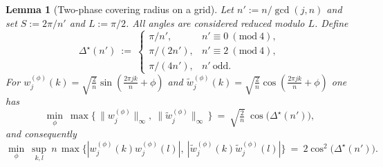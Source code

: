 \documentclass[12pt,fleqn]{amsart}
\newtheorem{lem}[thm]{Lemma}
\theoremstyle{remark}
\newcommand{\1}{\mathbf{1}}
\begin{document}
\begin{lem}[Two-phase covering radius on a grid]\label{lem:twophase}
Let $n':=n/\gcd(j,n)$ and set $S:=2\pi/n'$ and $L:=\pi/2$. All angles are considered reduced modulo $L$. Define
\[
\Delta^\star(n')\ :=\
\begin{cases}
\pi/n',     & n'\equiv 0\ (\mathrm{mod}\ 4),\\[1mm]
\pi/(2n'),  & n'\equiv 2\ (\mathrm{mod}\ 4),\\[1mm]
\pi/(4n'),  & n'\ \mathrm{odd}.
\end{cases}
\]
For $w^{(\phi)}_j(k)=\sqrt{\tfrac{2}{n}}\sin(\tfrac{2\pi jk}{n}+\phi)$ and
$\tilde w^{(\phi)}_j(k)=\sqrt{\tfrac{2}{n}}\cos(\tfrac{2\pi jk}{n}+\phi)$ one has
\[
\min_{\phi}\ \max\!\Big\{\,\|w^{(\phi)}_j\|_\infty,\ \|\tilde w^{(\phi)}_j\|_\infty\,\Big\}
\ =\ \sqrt{\tfrac2n}\ \cos\big(\Delta^\star(n')\big),
\]
and consequently
\[
\min_{\phi}\ \sup_{k,l}\ n\,\max\{|w^{(\phi)}_j(k)w^{(\phi)}_j(l)|,\ |\tilde w^{(\phi)}_j(k)\tilde w^{(\phi)}_j(l)|\}
\ =\ 2\cos^2\big(\Delta^\star(n')\big).
\]
\end{lem}
\end{document}
